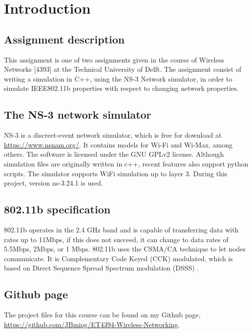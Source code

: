 \chapter{Introduction}

\section{Assignment description} 

This assignment is one of two assignments given in the course of Wireless Networks [4393] at the Technical University of Delft. The assignment consist of writing a simulation in C++, using the NS-3 Network simulator, in order to simulate IEEE802.11b properties with respect to changing network properties. 

\section{The NS-3 network simulator} 
NS-3 is a discreet-event network simulator, which is free for download at \url{https://www.nsnam.org/}. It contains models for Wi-Fi and Wi-Max, among others. The software is licensed under the GNU GPLv2 license. Although simulation files are  originally written in c++, recent features also support python scripts. The simulator supports WiFi simulation up to layer 3. During this project, version ns-3.24.1 is used.

\section{802.11b specification} 
802.11b operates in the 2.4 GHz band and is capable of transferring data with rates up to 11Mbps, if this does not succeed, it can change to data rates of 5.5Mbps, 2Mbps, or 1 Mbps. 802.11b uses the CSMA/CA technique to let nodes communicate. It is Complementary Code Keyed (CCK) modulated, which is based on Direct Sequence Spread Spectrum modulation (DSSS) \cite{802_11_b}.

\section{Github page}
The project files for this course can be found on my Github page, \url{https://github.com/JBmiog/ET4394-Wireless-Networking}.